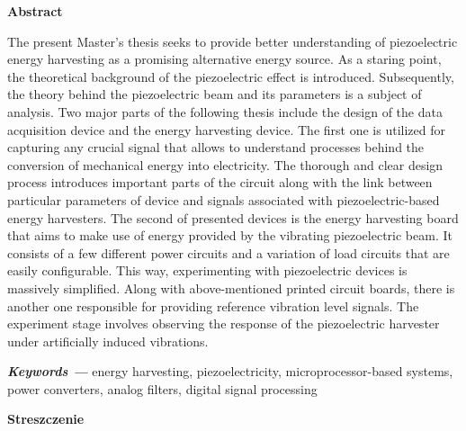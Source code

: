 \documentclass[12pt,a4paper]{article}
\providecommand{\keywords}[1]
{
  \small	
  \textbf{\textit{Keywords ---}} #1
}
\begin{document}
\newpage\null\thispagestyle{empty}\newpage
{\small{}
\textbf{Abstract}
\vspace{10pt}

The present Master's thesis seeks to provide better understanding of piezoelectric energy harvesting as a promising alternative energy source. As a staring point, the theoretical background of the piezoelectric effect is introduced. Subsequently, the theory behind the piezoelectric beam and its parameters is a subject of analysis. Two major parts of the following thesis include the design of the data acquisition device and the energy harvesting device. The first one is utilized for capturing any crucial signal that allows to understand processes behind the conversion of mechanical energy into electricity. The thorough and clear design process introduces important parts of the circuit along with the link between particular parameters of device and signals associated with piezoelectric-based energy harvesters. The second of presented devices is the energy harvesting board that aims to make use of energy provided by the vibrating piezoelectric beam. It consists of a few different power circuits and a variation of load circuits that are easily configurable. This way, experimenting with piezoelectric devices is massively simplified. Along with above-mentioned printed circuit boards, there is another one responsible for providing reference vibration level signals. The experiment stage involves observing the response of the piezoelectric harvester under artificially induced vibrations.
}
\par

\hspace{10pt}




\keywords{energy harvesting, piezoelectricity, microprocessor-based systems, power converters, analog filters, digital signal processing}

\vspace{20pt}
\textbf{Streszczenie}
\vspace{10pt}
\end{document}
